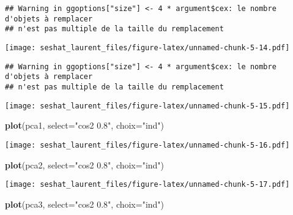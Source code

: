 \documentclass[
]{article}
\newenvironment{Shaded}{\begin{snugshade}}{\end{snugshade}}
\newcommand{\DataTypeTok}[1]{\textcolor[rgb]{0.13,0.29,0.53}{#1}}
\newcommand{\KeywordTok}[1]{\textcolor[rgb]{0.13,0.29,0.53}{\textbf{#1}}}
\newcommand{\NormalTok}[1]{#1}
\newcommand{\OperatorTok}[1]{\textcolor[rgb]{0.81,0.36,0.00}{\textbf{#1}}}
\newcommand{\StringTok}[1]{\textcolor[rgb]{0.31,0.60,0.02}{#1}}
\begin{document}
\begin{verbatim}
## Warning in ggoptions["size"] <- 4 * argument$cex: le nombre d'objets à remplacer
## n'est pas multiple de la taille du remplacement
\end{verbatim}

\texttt{[image: seshat\_laurent\_files/figure-latex/unnamed-chunk-5-14.pdf]}

\begin{Shaded}
\end{Shaded}

\begin{verbatim}
## Warning in ggoptions["size"] <- 4 * argument$cex: le nombre d'objets à remplacer
## n'est pas multiple de la taille du remplacement
\end{verbatim}

\texttt{[image: seshat\_laurent\_files/figure-latex/unnamed-chunk-5-15.pdf]}

\begin{Shaded}
\begin{Highlighting}[]
\KeywordTok{plot}\NormalTok{(pca1, }\DataTypeTok{select=}\StringTok{"cos2 0.8"}\NormalTok{, }\DataTypeTok{choix=}\StringTok{"ind"}\NormalTok{)}
\end{Highlighting}
\end{Shaded}

\texttt{[image: seshat\_laurent\_files/figure-latex/unnamed-chunk-5-16.pdf]}

\begin{Shaded}
\begin{Highlighting}[]
\KeywordTok{plot}\NormalTok{(pca2, }\DataTypeTok{select=}\StringTok{"cos2 0.8"}\NormalTok{, }\DataTypeTok{choix=}\StringTok{"ind"}\NormalTok{)}
\end{Highlighting}
\end{Shaded}

\texttt{[image: seshat\_laurent\_files/figure-latex/unnamed-chunk-5-17.pdf]}

\begin{Shaded}
\begin{Highlighting}[]
\KeywordTok{plot}\NormalTok{(pca3, }\DataTypeTok{select=}\StringTok{"cos2 0.8"}\NormalTok{, }\DataTypeTok{choix=}\StringTok{"ind"}\NormalTok{)}
\end{Highlighting}
\end{Shaded}
\end{document}
